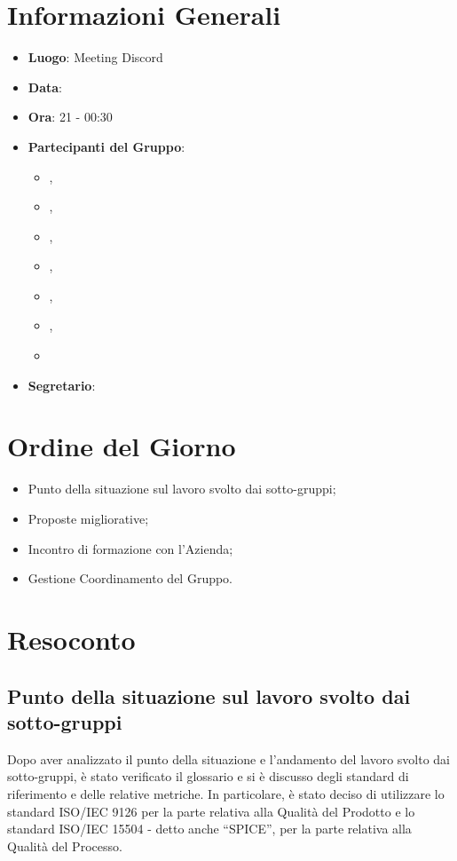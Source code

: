 \section{Informazioni Generali}

\begin{itemize}
\item{\textbf{Luogo}}: Meeting Discord
\item{\textbf{Data}}: \D{}
\item{\textbf{Ora}}: 21 - 00:30
\item{\textbf{Partecipanti del Gruppo}}: 
	\begin{itemize}
	\item{\EP{},} 
	\item{\FP{},}
	\item{\GC{},}
	\item{\LW{},}
	\item{\MB{},}
	\item{\MG{},}
	\item{\PV{}}
	\end{itemize} 
\item{\textbf{Segretario}}: \PV{}	
\end{itemize}

\section{Ordine del Giorno}
\begin{itemize}
\item{Punto della situazione sul lavoro svolto dai sotto-gruppi;}
\item{Proposte migliorative;}
\item{Incontro di formazione con l'Azienda;}
\item{Gestione Coordinamento del Gruppo.}
\end{itemize}

\section{Resoconto}

\subsection{Punto della situazione sul lavoro svolto dai sotto-gruppi}

Dopo aver analizzato il punto della situazione e l'andamento del lavoro svolto dai sotto-gruppi, è stato verificato il glossario e si è discusso degli standard di riferimento e delle relative metriche. In particolare, è stato deciso di utilizzare lo standard ISO/IEC 9126 per la parte relativa alla Qualità del Prodotto e lo standard ISO/IEC 15504 - detto anche “SPICE”, per la parte relativa alla Qualità del Processo.

